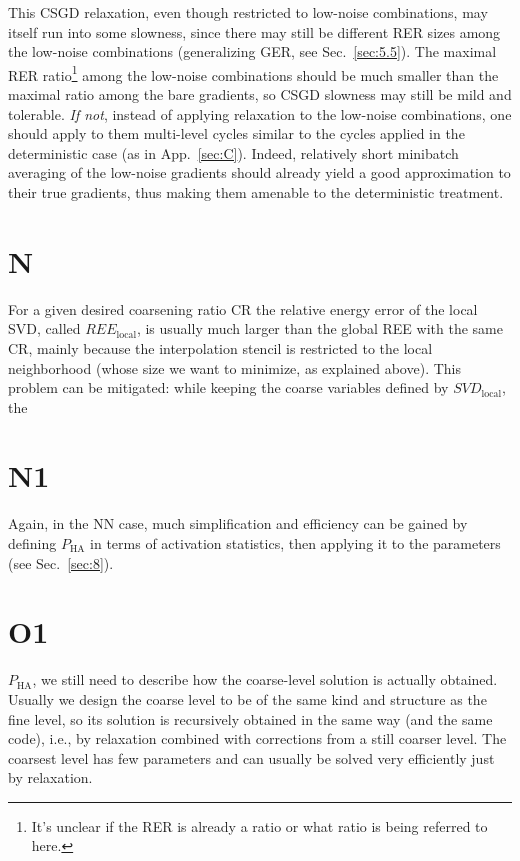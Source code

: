 \documentclass{article} %
\begin{document}
This CSGD relaxation, even though restricted to low-noise combinations, may itself run into some slowness, since there may still be different RER sizes among the low-noise combinations (generalizing GER, see Sec.~\ref{sec:5.5}). The maximal RER ratio\footnote{It's unclear if the RER is already a ratio or what ratio is being referred to here.} among the low-noise combinations should be much smaller than the maximal ratio among the bare gradients, so CSGD slowness may still be mild and tolerable. {\it If not}, instead of applying relaxation to the low-noise combinations, one should apply to them multi-level cycles similar to the cycles applied in the deterministic case (as in App.~\ref{sec:C}). Indeed, relatively short minibatch averaging of the low-noise gradients should already yield a good approximation to their true gradients, thus making them amenable to the deterministic treatment.

\section{N}
For a given desired coarsening ratio CR the relative energy error of the local SVD, called $REE_{\text{local}}$, is usually much larger than the global REE with the same CR, mainly because the interpolation stencil is restricted to the local neighborhood (whose size we want to minimize, as explained above). This problem can be mitigated: while keeping the coarse variables defined by $SVD_{\text{local}}$, the

\section{N1}
Again, in the NN case, much simplification and efficiency can be gained by defining $P_{\text{HA}}$ in terms of activation statistics, then applying it to the parameters (see Sec.~\ref{sec:8}).

\section{O1}
$P_{\text{HA}}$, we still need to describe how the coarse-level solution is actually obtained. Usually we design the coarse level to be of the same kind and structure as the fine level, so its solution is recursively obtained in the same way (and the same code), i.e., by relaxation combined with corrections from a still coarser level. The coarsest level has few parameters and can usually be solved very efficiently just by relaxation.
\end{document}
